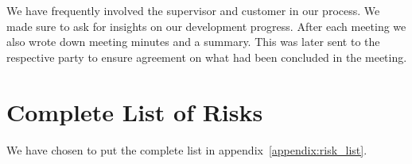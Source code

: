 We have frequently involved the supervisor and customer in our process.
We made sure to ask for insights on our development progress. After
each meeting we also wrote down meeting minutes and a summary. This was
later sent to the respective party to ensure agreement on what had been
concluded in the meeting.

\section{Complete List of Risks}
We have chosen to put the complete list in appendix~\ref{appendix:risk_list}.
